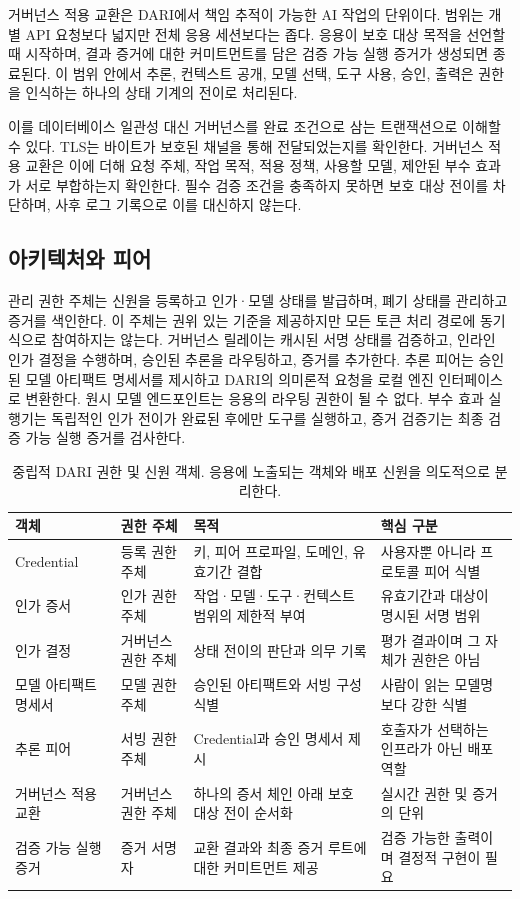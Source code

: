 \documentclass[10pt]{article}
\begin{document}
거버넌스 적용 교환은 DARI에서 책임 추적이 가능한 AI 작업의 단위이다. 범위는 개별 API 요청보다 넓지만 전체 응용 세션보다는 좁다. 응용이 보호 대상 목적을 선언할 때 시작하며, 결과 증거에 대한 커미트먼트를 담은 검증 가능 실행 증거가 생성되면 종료된다. 이 범위 안에서 추론, 컨텍스트 공개, 모델 선택, 도구 사용, 승인, 출력은 권한을 인식하는 하나의 상태 기계의 전이로 처리된다.

이를 데이터베이스 일관성 대신 거버넌스를 완료 조건으로 삼는 트랜잭션으로 이해할 수 있다. TLS는 바이트가 보호된 채널을 통해 전달되었는지를 확인한다. 거버넌스 적용 교환은 이에 더해 요청 주체, 작업 목적, 적용 정책, 사용할 모델, 제안된 부수 효과가 서로 부합하는지 확인한다. 필수 검증 조건을 충족하지 못하면 보호 대상 전이를 차단하며, 사후 로그 기록으로 이를 대신하지 않는다.

\subsection{아키텍처와 피어}

관리 권한 주체는 신원을 등록하고 인가·모델 상태를 발급하며, 폐기 상태를 관리하고 증거를 색인한다. 이 주체는 권위 있는 기준을 제공하지만 모든 토큰 처리 경로에 동기식으로 참여하지는 않는다. 거버넌스 릴레이는 캐시된 서명 상태를 검증하고, 인라인 인가 결정을 수행하며, 승인된 추론을 라우팅하고, 증거를 추가한다. 추론 피어는 승인된 모델 아티팩트 명세서를 제시하고 DARI의 의미론적 요청을 로컬 엔진 인터페이스로 변환한다. 원시 모델 엔드포인트는 응용의 라우팅 권한이 될 수 없다. 부수 효과 실행기는 독립적인 인가 전이가 완료된 후에만 도구를 실행하고, 증거 검증기는 최종 검증 가능 실행 증거를 검사한다.

\begin{table}[t]
\centering
\caption{중립적 DARI 권한 및 신원 객체. 응용에 노출되는 객체와 배포 신원을 의도적으로 분리한다.}
\label{tab:objects}
\small
\begin{tabularx}{\textwidth}{@{}l l Y Y@{}}
\toprule
객체 & 권한 주체 & 목적 & 핵심 구분 \\
\midrule
Credential & 등록 권한 주체 & 키, 피어 프로파일, 도메인, 유효기간 결합 & 사용자뿐 아니라 프로토콜 피어 식별 \\
인가 증서 & 인가 권한 주체 & 작업·모델·도구·컨텍스트 범위의 제한적 부여 & 유효기간과 대상이 명시된 서명 범위 \\
인가 결정 & 거버넌스 권한 주체 & 상태 전이의 판단과 의무 기록 & 평가 결과이며 그 자체가 권한은 아님 \\
모델 아티팩트 명세서 & 모델 권한 주체 & 승인된 아티팩트와 서빙 구성 식별 & 사람이 읽는 모델명보다 강한 식별 \\
추론 피어 & 서빙 권한 주체 & Credential과 승인 명세서 제시 & 호출자가 선택하는 인프라가 아닌 배포 역할 \\
거버넌스 적용 교환 & 거버넌스 권한 주체 & 하나의 증서 체인 아래 보호 대상 전이 순서화 & 실시간 권한 및 증거의 단위 \\
검증 가능 실행 증거 & 증거 서명자 & 교환 결과와 최종 증거 루트에 대한 커미트먼트 제공 & 검증 가능한 출력이며 결정적 구현이 필요 \\
\bottomrule
\end{tabularx}
\end{table}
\end{document}
